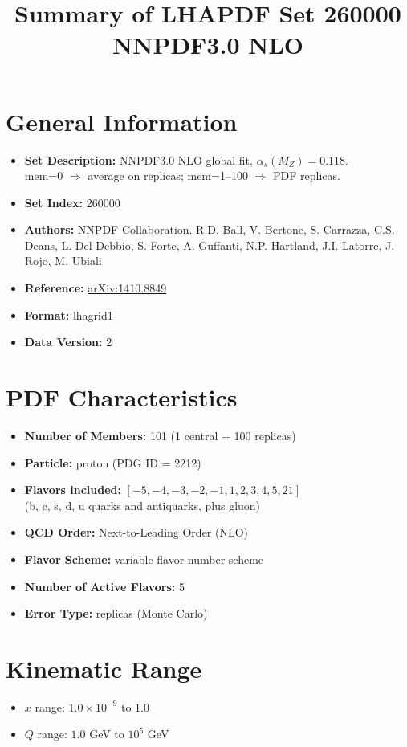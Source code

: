 \documentclass[a4paper,11pt]{article}
\title{Summary of LHAPDF Set 260000\\ \large NNPDF3.0 NLO}
\author{}
\date{}
\begin{document}
\maketitle

\section*{General Information}
\begin{itemize}
    \item \textbf{Set Description:} NNPDF3.0 NLO global fit, $\alpha_s(M_Z) = 0.118$. \\
    mem=0 $\Rightarrow$ average on replicas; mem=1--100 $\Rightarrow$ PDF replicas.
    \item \textbf{Set Index:} 260000
    \item \textbf{Authors:} NNPDF Collaboration. R.D. Ball, V. Bertone, S. Carrazza, C.S. Deans, L. Del Debbio, S. Forte, A. Guffanti, N.P. Hartland, J.I. Latorre, J. Rojo, M. Ubiali
    \item \textbf{Reference:} \href{https://arxiv.org/abs/1410.8849}{arXiv:1410.8849}
    \item \textbf{Format:} lhagrid1
    \item \textbf{Data Version:} 2
\end{itemize}

\section*{PDF Characteristics}
\begin{itemize}
    \item \textbf{Number of Members:} 101 (1 central + 100 replicas)
    \item \textbf{Particle:} proton (PDG ID = 2212)
    \item \textbf{Flavors included:} $[-5, -4, -3, -2, -1, 1, 2, 3, 4, 5, 21]$ \\
    (b, c, s, d, u quarks and antiquarks, plus gluon)
    \item \textbf{QCD Order:} Next-to-Leading Order (NLO)
    \item \textbf{Flavor Scheme:} variable flavor number scheme
    \item \textbf{Number of Active Flavors:} 5
    \item \textbf{Error Type:} replicas (Monte Carlo)
\end{itemize}

\section*{Kinematic Range}
\begin{itemize}
    \item $x$ range: $1.0 \times 10^{-9}$ to $1.0$
    \item $Q$ range: $1.0$ GeV to $10^{5}$ GeV
\end{itemize}
\end{document}
